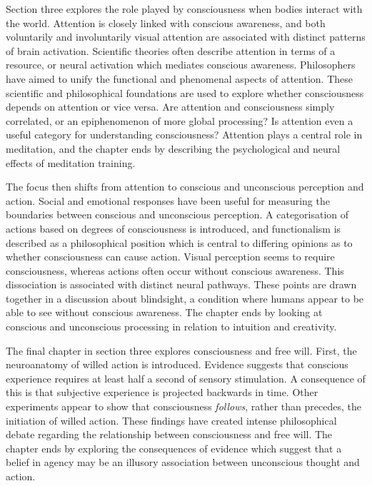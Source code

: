 \documentclass[a4paper]{article}
\begin{document}
Section three explores the role played by consciousness when bodies interact
with the world. Attention is closely linked with conscious awareness, and both
voluntarily and involuntarily visual attention are associated with distinct
patterns of brain activation. Scientific theories often describe attention in
terms of a resource, or neural activation which mediates conscious awareness.
Philosophers have aimed to unify the functional and phenomenal aspects of
attention. These scientific and philosophical foundations are used to explore
whether consciousness depends on attention or vice versa. Are attention and
consciousness simply correlated, or an epiphenomenon of more global
processing? Is attention even a useful category for understanding
consciousness? Attention plays a central role in meditation, and the chapter
ends by describing the psychological and neural effects of meditation
training.

The focus then shifts from attention to conscious and unconscious perception
and action. Social and emotional responses have been useful for measuring the
boundaries between conscious and unconscious perception. A categorisation of
actions based on degrees of consciousness is introduced, and functionalism is
described as a philosophical position which is central to differing opinions
as to whether consciousness can cause action. Visual perception seems to
require consciousness, whereas actions often occur without conscious
awareness. This dissociation is associated with distinct neural pathways.
These points are drawn together in a discussion about blindsight, a condition
where humans appear to be able to see without conscious awareness. The chapter
ends by looking at conscious and unconscious processing in relation to
intuition and creativity.

The final chapter in section three explores consciousness and free will.
First, the neuroanatomy of willed action is introduced. Evidence suggests that
conscious experience requires at least half a second of sensory stimulation. A
consequence of this is that subjective experience is projected backwards in
time. Other experiments appear to show that consciousness \textit{follows},
rather than precedes, the initiation of willed action. These findings have
created intense philosophical debate regarding the relationship between
consciousness and free will. The chapter ends by exploring the consequences of
evidence which suggest that a belief in agency may be an illusory association
between unconscious thought and action.
\end{document}
